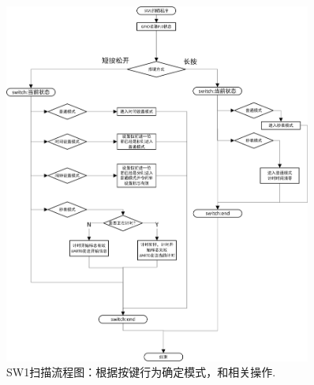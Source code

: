 \documentclass[12pt, a4paper, oneside]{ctexart}
\begin{document}
    \begin{figure}[t]
        \centering
        \includegraphics[width=0.9\textwidth]{./img/flowchart_SW1.png}
        \caption{SW1扫描流程图：根据按键行为确定模式，和相关操作.} 
        \label{fig:SW1}
    \end{figure}
\end{document}
